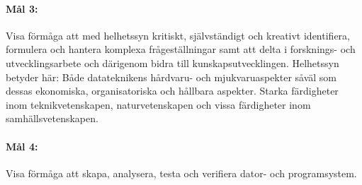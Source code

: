 % 
% 
% 

\paragraph{Mål 3:} Visa förmåga att med helhetssyn kritiskt,
självständigt och kreativt identifiera, formulera och hantera komplexa
frågeställningar samt att delta i forsknings- och utvecklingsarbete
och därigenom bidra till kunskapsutvecklingen.
%
Helhetssyn betyder här: Både datateknikens hårdvaru- och
mjukvaruaspekter såväl som dessas ekonomiska, organisatoriska och
hållbara aspekter. Starka färdigheter inom teknikvetenskapen,
naturvetenskapen och vissa färdigheter inom samhällsvetenskapen.

% 
% 

\paragraph{Mål 4:} Visa förmåga att skapa, analysera, testa och
verifiera dator- och programsystem.


% 
% 
% 
% 
% 


